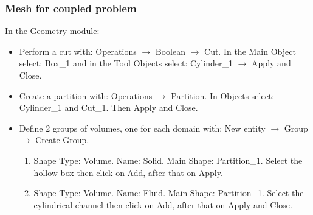 \documentclass[10pt, hyperref={unicode=true,pdfusetitle, bookmarks=true,bookmarksnumbered=false,bookmarksopen=false, breaklinks=false,pdfborder={0 0l 1},backref=true,colorlinks=true,linkcolor=darkblue,pageanchor}]{beamer}
\begin{document}
\begin{frame}
\frametitle{Mesh for coupled problem}

\begin{block}{In the Geometry module:}
\begin{itemize}

 \item Perform a cut with: Operations $\rightarrow$ Boolean $\rightarrow$ Cut. In the Main Object select: Box\_1 and in the Tool Objects select: Cylinder\_1 $\rightarrow$ Apply and Close.
 
 \item Create a partition with: Operations $\rightarrow$ Partition. In Objects select: Cylinder\_1 and Cut\_1. Then Apply and Close.

 \item Define 2 groups of volumes, one for each domain with: New entity $\rightarrow$ Group $\rightarrow$ Create Group.
 \begin{enumerate}
 \item  Shape Type: Volume. Name: Solid. Main Shape: Partition\_1. Select the hollow box then click on Add, after that on Apply.
 \item  Shape Type: Volume. Name: Fluid. Main Shape: Partition\_1. Select the cylindrical channel then click on Add, after that on Apply and Close.
 \end{enumerate}
 
\end{itemize}
 \end{block}

\end{frame}
\end{document}

